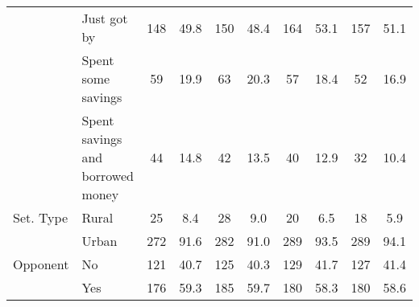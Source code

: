 \begin{table}
{\begin{tabular}[t]{llcccccccc}
 & Just got by & 148 & 49.8 & 150 & 48.4 & 164 & 53.1 & 157 & 51.1\\
 & Spent some savings & 59 & 19.9 & 63 & 20.3 & 57 & 18.4 & 52 & 16.9\\
 & Spent savings and
borrowed money & 44 & 14.8 & 42 & 13.5 & 40 & 12.9 & 32 & 10.4\\
Set. Type & Rural & 25 & 8.4 & 28 & 9.0 & 20 & 6.5 & 18 & 5.9\\
 & Urban & 272 & 91.6 & 282 & 91.0 & 289 & 93.5 & 289 & 94.1\\
Opponent & No & 121 & 40.7 & 125 & 40.3 & 129 & 41.7 & 127 & 41.4\\
 & Yes & 176 & 59.3 & 185 & 59.7 & 180 & 58.3 & 180 & 58.6\\
\bottomrule
\end{tabular}}
\end{table}

